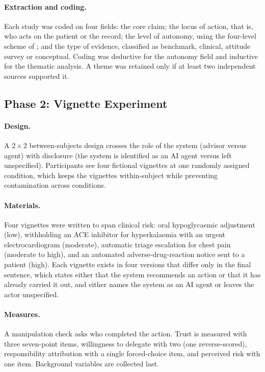 \paragraph{Extraction and coding.}
Each study was coded on four fields: the core claim; the locus of action, that is, who acts on the patient or the record; the level of autonomy, using the four-level scheme of \citet{ye2025autonomy}; and the type of evidence, classified as benchmark, clinical, attitude survey or conceptual. Coding was deductive for the autonomy field and inductive for the thematic analysis. A theme was retained only if at least two independent sources supported it.

\subsection{Phase 2: Vignette Experiment}
\label{sec:protocol}

\paragraph{Design.}
A $2\times2$ between-subjects design crosses the role of the system (advisor versus agent) with disclosure (the system is identified as an AI agent versus left unspecified). Participants see four fictional vignettes at one randomly assigned condition, which keeps the vignettes within-subject while preventing contamination across conditions.

\paragraph{Materials.}
Four vignettes were written to span clinical risk: oral hypoglycaemic adjustment (low), withholding an ACE inhibitor for hyperkalaemia with an urgent electrocardiogram (moderate), automatic triage escalation for chest pain (moderate to high), and an automated adverse-drug-reaction notice sent to a patient (high). Each vignette exists in four versions that differ only in the final sentence, which states either that the system recommends an action or that it has already carried it out, and either names the system as an AI agent or leaves the actor unspecified.

\paragraph{Measures.}
A manipulation check asks who completed the action. Trust is measured with three seven-point items, willingness to delegate with two (one reverse-scored), responsibility attribution with a single forced-choice item, and perceived risk with one item. Background variables are collected last.

